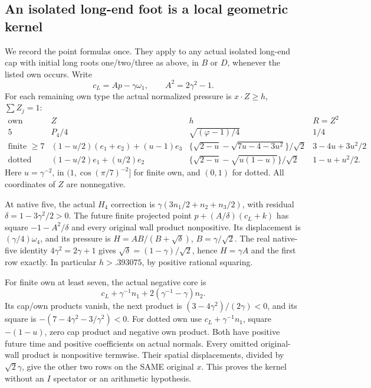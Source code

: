 \subsection{An isolated long-end foot is a local geometric kernel}
\label{app:exact19:longfeet}

We record the point formulas once.
They apply to any actual isolated
long-end cap with initial long roots
one/two/three as above, in \(B\) or
\(D\), whenever the listed own occurs.
Write
\[
                  c_L=Ap-\gamma\omega_1,\qquad A^2=2\gamma^2-1 .
\]
For each remaining own type the
actual normalized pressure is
\(x\cdot Z\ge h\), \(\sum Z_j=1\):
\[
\begin{array}{c|c|c|c}
 \text{own}&Z&h&R=Z^2\\ \hline
 5&P_4/4&\sqrt{(\varphi-1)/4}&1/4\\
 \text{finite }\ge7&
 (1-u/2)(e_1+e_2)+(u-1)e_3&
 \{\sqrt{2-u}-\sqrt{7u-4-3u^2}\}/\sqrt2&
                   3-4u+3u^2/2\\
 \text{dotted}&(1-u/2)e_1+(u/2)e_2&
 \{\sqrt{2-u}-\sqrt{u(1-u)}\}/\sqrt2&
                   1-u+u^2/2 .
\end{array}
\tag{B19headfeet}\label{app:exact19:eq:longfeet}
\]
Here \(u=\gamma^{-2}\), in
\((1,\cos(\pi/7)^{-2}]\) for finite
own, and \((0,1)\) for dotted.
All coordinates of \(Z\) are
nonnegative.

At native five, the actual \(H_4\)
correction is
\(\gamma(3n_1/2+n_2+n_3/2)\),
with residual
\(\delta=1-3\gamma^2/2>0\).
The future finite projected point
\(p+(A/\delta)(c_L+k)\) has square
\(-1-A^2/\delta\) and every original
wall product nonpositive.
Its displacement is
\((\gamma/4)\omega_4\), and its
pressure is \(H=AB/(B+\sqrt\delta)\),
\(B=\gamma/\sqrt2\).
The real native-five identity
\(4\gamma^2=2\gamma+1\) gives
\(\sqrt\delta=(1-\gamma)/\sqrt2\),
hence \(H=\gamma A\) and the first
row exactly.
In particular \(h>.393075\),
by positive rational squaring.

For finite own at least seven,
the actual negative core is
\[
 c_L+\gamma^{-1}n_1+2(\gamma^{-1}-\gamma)n_2 .
\]
Its cap/own products vanish, the
next product is
\((3-4\gamma^2)/(2\gamma)<0\),
and its square is
\(-(7-4\gamma^2-3/\gamma^2)<0\).
For dotted own use
\(c_L+\gamma^{-1}n_1\), square
\(-(1-u)\), zero cap product and
negative own product.
Both have positive future time
and positive coefficients on actual
normals.
Every omitted original-wall product
is nonpositive termwise.
Their spatial displacements, divided
by \(\sqrt2\gamma\), give the other
two rows on the SAME original \(x\).
This proves the kernel without an
\(I\) spectator or an arithmetic
hypothesis.

